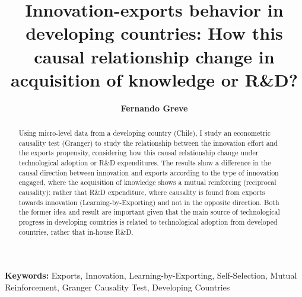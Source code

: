 \documentclass[preprint,11pt]{article}
\title{Innovation-exports behavior in developing countries: 
How this causal relationship change in acquisition of knowledge or R\&D?}
\author{\bfseries{Fernando Greve}}
\providecommand{\keywords}[1]{\textbf{Keywords:} #1}
\begin{document}
\maketitle

\begin{abstract} Using micro-level data from a developing country (Chile), I study an econometric causality test (Granger) to study the relationship between the innovation effort and the exports propensity, considering how this causal relationship change under technological adoption or R\&D expenditures. The results show a difference in the causal direction between innovation and exports according to the type of innovation engaged, where the acquisition of knowledge shows a mutual reinforcing (reciprocal causality); rather that R\&D expenditure, where causality is found from exports towards innovation (Learning-by-Exporting) and not in the opposite direction. Both the former idea and result are important given that the main source of technological progress in developing countries is related to technological adoption from developed countries, rather that in-house R\&D.\end{abstract}

\keywords{Exports, Innovation, Learning-by-Exporting, Self-Selection, Mutual Reinforcement, Granger Causality Test, Developing Countries}


\linenumbers

%
%







%





%

\newpage

\end{document}
